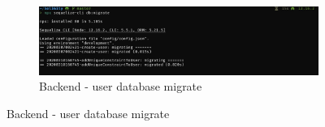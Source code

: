 \documentclass[12pt]{article}
\renewcommand{\_}{\kern-1.5pt\textunderscore\kern-1.5pt}
\begin{document}
\begin{figure}[H]
\begin{minipage}[t]{0.5\linewidth}
\begin{subfigure}[b]{\textwidth}
		\end{subfigure}
		\begin{subfigure}[b]{\textwidth}
			\captionsetup{justification   = raggedright,
              singlelinecheck = false}
			\centering
						\caption*{Backend - user database migrate}

			\includegraphics[width=\textwidth]{graphs/03. user_db_migrate}
		\end{subfigure}

	\end{minipage}
\end{figure}
\end{document}
